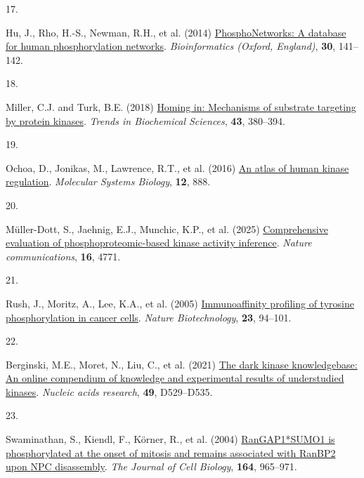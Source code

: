 \documentclass[
]{article}
\newlength{\cslhangindent}
\newlength{\csllabelwidth}
\newenvironment{CSLReferences}[2] %
 {\begin{list}{}{%
  \setlength{\itemindent}{0pt}
  \setlength{\leftmargin}{0pt}
  \setlength{\parsep}{0pt}
  \ifodd #1
   \setlength{\leftmargin}{\cslhangindent}
   \setlength{\itemindent}{-1\cslhangindent}
  \fi
  \setlength{\itemsep}{#2\baselineskip}}}
 {\end{list}}
\newcommand{\CSLLeftMargin}[1]{\parbox[t]{\csllabelwidth}{\strut#1\strut}}
\newcommand{\CSLRightInline}[1]{\parbox[t]{\linewidth - \csllabelwidth}{\strut#1\strut}}
\begin{document}
\begin{CSLReferences}{0}{0}
\CSLLeftMargin{17. }%
\CSLRightInline{Hu, J., Rho, H.-S., Newman, R.H., et al. (2014)
\href{https://doi.org/10.1093/bioinformatics/btt627}{{PhosphoNetworks}:
A database for human phosphorylation networks}. \emph{Bioinformatics
(Oxford, England)}, \textbf{30}, 141--142.}

\CSLLeftMargin{18. }%
\CSLRightInline{Miller, C.J. and Turk, B.E. (2018)
\href{https://doi.org/10.1016/j.tibs.2018.02.009}{Homing in: Mechanisms
of substrate targeting by protein kinases}. \emph{Trends in Biochemical
Sciences}, \textbf{43}, 380--394.}

\CSLLeftMargin{19. }%
\CSLRightInline{Ochoa, D., Jonikas, M., Lawrence, R.T., et al. (2016)
\href{https://doi.org/10.15252/msb.20167295}{An atlas of human kinase
regulation}. \emph{Molecular Systems Biology}, \textbf{12}, 888.}

\CSLLeftMargin{20. }%
\CSLRightInline{Müller-Dott, S., Jaehnig, E.J., Munchic, K.P., et al.
(2025) \href{https://doi.org/10.1038/s41467-025-59779-y}{Comprehensive
evaluation of phosphoproteomic-based kinase activity inference}.
\emph{Nature communications}, \textbf{16}, 4771.}

\CSLLeftMargin{21. }%
\CSLRightInline{Rush, J., Moritz, A., Lee, K.A., et al. (2005)
\href{https://doi.org/10.1038/nbt1046}{Immunoaffinity profiling of
tyrosine phosphorylation in cancer cells}. \emph{Nature Biotechnology},
\textbf{23}, 94--101.}

\CSLLeftMargin{22. }%
\CSLRightInline{Berginski, M.E., Moret, N., Liu, C., et al. (2021)
\href{https://doi.org/10.1093/nar/gkaa853}{The dark kinase
knowledgebase: An online compendium of knowledge and experimental
results of understudied kinases}. \emph{Nucleic acids research},
\textbf{49}, D529--D535.}

\CSLLeftMargin{23. }%
\CSLRightInline{Swaminathan, S., Kiendl, F., Körner, R., et al. (2004)
\href{https://doi.org/10.1083/jcb.200309126}{{RanGAP1*SUMO1} is
phosphorylated at the onset of mitosis and remains associated with
{RanBP2} upon {NPC} disassembly}. \emph{The Journal of Cell Biology},
\textbf{164}, 965--971.}

\end{CSLReferences}
\end{document}
